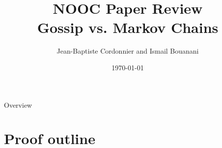 \documentclass{beamer}
\title{NOOC Paper Review\\Gossip vs. Markov Chains}
\author{Jean-Baptiste Cordonnier and Ismail Bouanani}
\date{\today}
\begin{document}



\frame{\titlepage}

\begin{frame}{Overview}
\tableofcontents
\end{frame}


\section {Proof outline}

\frame{\sectionpage}
\end{document}
